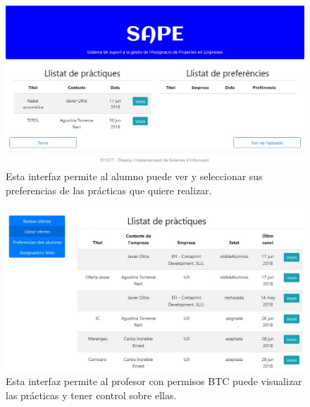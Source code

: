 \documentclass[pdftex,11pt,a4paper]{book}
\begin{document}
\begin{figure}[h]
\begin{center}
\includegraphics[width=\textwidth]{img/intefaz1.jpg}
\caption{\label{interfaz1}Esta interfaz permite al alumno puede ver y seleccionar sus preferencias de las prácticas que quiere realizar.}
\end{center}
\end{figure}

\begin{figure}[h]
\begin{center}
\includegraphics[width=\textwidth]{img/intefaz2.jpg}
\caption{\label{interfaz2}Esta interfaz permite al profesor con permisos BTC puede visualizar las prácticas y tener control sobre ellas.}
\end{center}
\end{figure}
\end{document}
